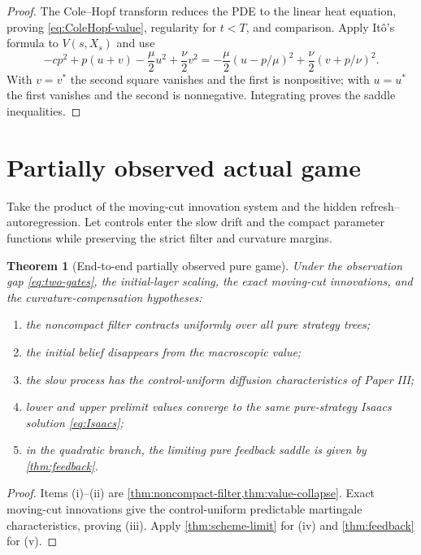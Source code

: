 \documentclass[11pt,reqno]{amsart}
\newtheorem{theorem}{Theorem}[section]
\theoremstyle{definition}
\theoremstyle{remark}
\begin{document}
\begin{proof}
The Cole--Hopf transform reduces the PDE to the linear heat equation, proving
\eqref{eq:ColeHopf-value}, regularity for $t<T$, and comparison.  Apply It\^o's
formula to $V(s,X_s)$ and use
\[
 -c p^2+p(u+v)-\frac\mu2u^2+
 \frac\nu2v^2
 =-\frac\mu2(u-p/\mu)^2+
 \frac\nu2(v+p/\nu)^2.
\]
With $v=v^*$ the second square vanishes and the first is nonpositive; with
$u=u^*$ the first vanishes and the second is nonnegative.  Integrating proves
the saddle inequalities.
\end{proof}

\section{Partially observed actual game}\label{sec:combined}

Take the product of the moving-cut innovation system and the hidden
refresh--autoregression.  Let controls enter the slow drift and the compact
parameter functions while preserving the strict filter and curvature margins.

\begin{theorem}[End-to-end partially observed pure game]\label{thm:endtoend}
Under the observation gap \eqref{eq:two-gates}, the initial-layer scaling, the
exact moving-cut innovations, and the curvature-compensation hypotheses:
\begin{enumerate}[label=(\roman*)]
\item the noncompact filter contracts uniformly over all pure strategy trees;
\item the initial belief disappears from the macroscopic value;
\item the slow process has the control-uniform diffusion characteristics of
Paper III;
\item lower and upper prelimit values converge to the same pure-strategy
Isaacs solution \eqref{eq:Isaacs};
\item in the quadratic branch, the limiting pure feedback saddle is given by
\cref{thm:feedback}.
\end{enumerate}
\end{theorem}

\begin{proof}
Items (i)--(ii) are \cref{thm:noncompact-filter,thm:value-collapse}.  Exact
moving-cut innovations give the control-uniform predictable martingale
characteristics, proving (iii).  Apply \cref{thm:scheme-limit} for (iv) and
\cref{thm:feedback} for (v).
\end{proof}
\end{document}
